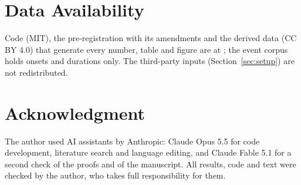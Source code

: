 \documentclass[lettersize,journal]{IEEEtran}
\theoremstyle{definition}
\theoremstyle{remark}
\begin{document}
\section*{Data Availability}
Code (MIT), the pre-registration with its amendments and the derived data (CC BY 4.0) that generate every number, table and figure are at \repoURL{}; the event corpus holds onsets and durations only. The third-party inputs (Section~\ref{sec:setup}) are not redistributed.

\section*{Acknowledgment}
The author used AI assistants by Anthropic: Claude Opus 5.5 for code development, literature search and language editing, and Claude Fable 5.1 for a second check of the proofs and of the manuscript. All results, code and text were checked by the author, who takes full responsibility for them.



\end{document}
